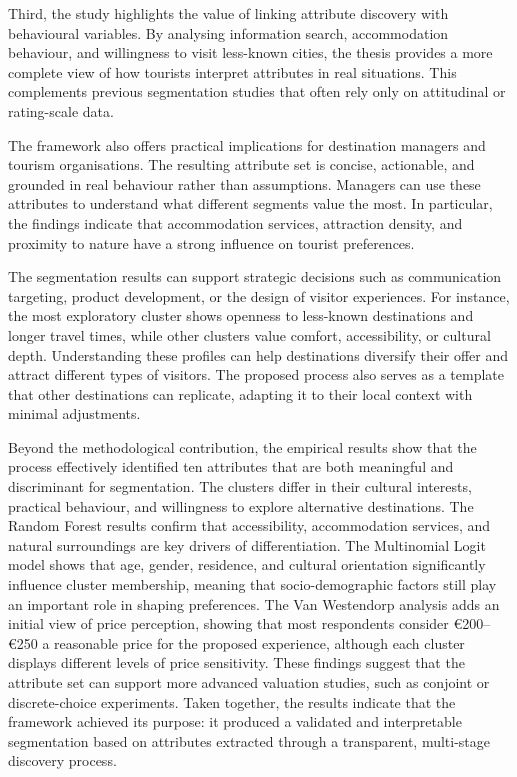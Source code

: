 \documentclass[a4paper, 12pt, twoside]{report}  %
\begin{document}
\indent Third, the study highlights the value of linking attribute discovery with behavioural variables. By analysing information search, accommodation behaviour, and willingness to visit less-known cities, the thesis provides a more complete view of how tourists interpret attributes in real situations. This complements previous segmentation studies that often rely only on attitudinal or rating-scale data.

\indent The framework also offers practical implications for destination managers and tourism organisations. The resulting attribute set is concise, actionable, and grounded in real behaviour rather than assumptions. Managers can use these attributes to understand what different segments value the most. In particular, the findings indicate that accommodation services, attraction density, and proximity to nature have a strong influence on tourist preferences.

\indent The segmentation results can support strategic decisions such as communication targeting, product development, or the design of visitor experiences. For instance, the most exploratory cluster shows openness to less-known destinations and longer travel times, while other clusters value comfort, accessibility, or cultural depth. Understanding these profiles can help destinations diversify their offer and attract different types of visitors. The proposed process also serves as a template that other destinations can replicate, adapting it to their local context with minimal adjustments.

\indent Beyond the methodological contribution, the empirical results show that the process effectively identified ten attributes that are both meaningful and discriminant for segmentation. The clusters differ in their cultural interests, practical behaviour, and willingness to explore alternative destinations. The Random Forest results confirm that accessibility, accommodation services, and natural surroundings are key drivers of differentiation. The Multinomial Logit model shows that age, gender, residence, and cultural orientation significantly influence cluster membership, meaning that socio-demographic factors still play an important role in shaping preferences. The Van Westendorp analysis adds an initial view of price perception, showing that most respondents consider €200–€250 a reasonable price for the proposed experience, although each cluster displays different levels of price sensitivity. These findings suggest that the attribute set can support more advanced valuation studies, such as conjoint or discrete-choice experiments. Taken together, the results indicate that the framework achieved its purpose: it produced a validated and interpretable segmentation based on attributes extracted through a transparent, multi-stage discovery process.
\end{document}
